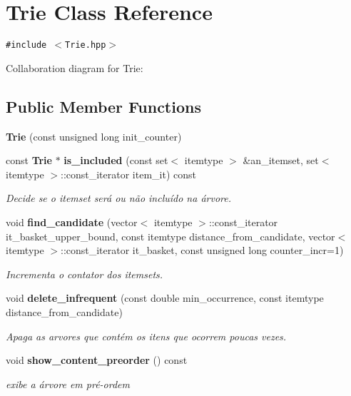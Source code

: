 \section{Trie Class Reference}
\label{classTrie}
{\tt \#include $<$Trie.hpp$>$}

Collaboration diagram for Trie:\subsection*{Public Member Functions}
\begin{CompactItemize}
\item 
\textbf{Trie} (const unsigned long init\_\-counter)\label{classTrie_a69a43e2b203fb1d941ef775ab418653}

\item 
const {\bf Trie} $\ast$ {\bf is\_\-included} (const set$<$ itemtype $>$ \&an\_\-itemset, set$<$ itemtype $>$::const\_\-iterator item\_\-it) const \label{classTrie_6ffeb178c753d43db1b2ab913010f7b2}

\begin{CompactList}\small\item\em Decide se o itemset será ou não incluído na árvore. \item\end{CompactList}\item 
void {\bf find\_\-candidate} (vector$<$ itemtype $>$::const\_\-iterator it\_\-basket\_\-upper\_\-bound, const itemtype distance\_\-from\_\-candidate, vector$<$ itemtype $>$::const\_\-iterator it\_\-basket, const unsigned long counter\_\-incr=1)\label{classTrie_ad76607a96c1459a8f2b9b8a8b188e92}

\begin{CompactList}\small\item\em Incrementa o contator dos itemsets. \item\end{CompactList}\item 
void {\bf delete\_\-infrequent} (const double min\_\-occurrence, const itemtype distance\_\-from\_\-candidate)\label{classTrie_d11c3c3c62ab2c917b7e9a461e9cafa2}

\begin{CompactList}\small\item\em Apaga as arvores que contém os itens que ocorrem poucas vezes. \item\end{CompactList}\item 
void {\bf show\_\-content\_\-preorder} () const\label{classTrie_9b6487026b7a776c542c80002d14ae7d}

\begin{CompactList}\small\item\em exibe a árvore em pré-ordem \item\end{CompactList}\end{CompactItemize}

